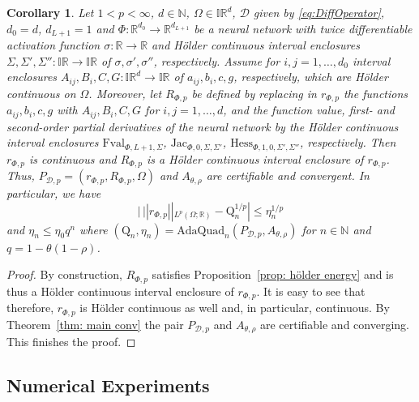 \documentclass[a4paper, 11pt]{article}
\newtheorem{corollary}[theorem]{Corollary}
\begin{document}
	
	\begin{corollary}\label{corr:mainEnergy}
		Let $1 < p < \infty$, $d\in \mathbb{N}$, $\Omega \in \mathbb{IR}^d$, $\mathcal{D}$ given by \eqref{eq:DiffOperator}, $d_0=d$, $d_{L+1}=1$ and $\Phi : \mathbb{R}^{d_0} \to \mathbb{R}^{d_{L+1}}$ be a neural network with twice differentiable activation function $\sigma : \mathbb{R} \to \mathbb{R}$ and Hölder continuous interval enclosures $\Sigma,\Sigma',\Sigma'':\mathbb{IR}\to \mathbb{IR}$ of $\sigma,\sigma',\sigma''$, respectively.
		Assume for $i,j=1,\dotsc,d_0$ interval enclosures $A_{ij},B_i,C,G: \mathbb{IR}^d \to \mathbb{IR}$ of $a_{ij},b_i,c,g$, respectively, which are Hölder continuous on $\Omega$. Moreover, let $R_{\Phi,p}$ be defined by replacing in 
		$r_{\Phi,p}$ the functions $a_{ij},b_i,c,g$ with $A_{ij}, B_i,C,G$ for $i,j=1,\dotsc,d$, and the function value, first- and second-order partial derivatives of the neural network by the Hölder continuous interval 
		enclosures $\mathrm{Fval}_{\Phi, L+1, \Sigma}$, $\mathrm{Jac}_{\Phi,0,\Sigma, \Sigma'}$, 
		$\mathrm{Hess}_{\Phi,1,0,\Sigma',\Sigma''}$, 
		respectively. Then $r_{\Phi,p}$ is continuous and $R_{\Phi,p}$ is a Hölder continuous interval enclosure of $r_{\Phi,p}$. 
		Thus, $P_{\mathcal{D},p}=(r_{\Phi,p}, R_{\Phi,p}, \Omega)$ and {$A_{\theta, \rho}$} are certifiable and convergent. 
		In particular, we have
		$$ |\, ||r_{\Phi,p}||_{L^{p}(\Omega; \mathbb{R})} - \mathrm{Q}_n^{1/p}| \leq \eta_n^{1/p} $$
		and $\eta_n\leq \eta_0 q^n$ where $(\mathrm{Q}_n, \eta_n) = \mathrm{AdaQuad}_n(P_{\mathcal{D},p}, A_{\theta, \rho})$ for $n\in \mathbb{N}$ and $q = 1 - \theta(1-\rho)$.
	\end{corollary}
	\begin{proof}
		By construction, $R_{\Phi,p}$ satisfies Proposition~\ref{prop: hölder energy} and is thus a Hölder continuous interval enclosure of $r_{\Phi,p}$. It is easy to see that therefore, $r_{\Phi,p}$ is Hölder continuous as well and, in particular, continuous. 
		By Theorem~\ref{thm: main conv} the pair $P_{\mathcal{D},p}$ and $A_{\theta,\rho}$ are certifiable and converging. This finishes the proof.
	\end{proof}
	
	
	\subsection{Numerical Experiments}
	\label{sec:numerical_experiments}
	
\end{document}
